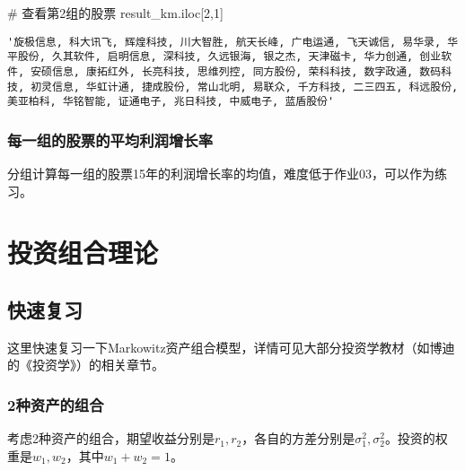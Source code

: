 \documentclass[
  letterpaper,
  DIV=11,
  numbers=noendperiod]{scrreprt}
\newenvironment{Shaded}{\begin{snugshade}}{\end{snugshade}}
\newcommand{\CommentTok}[1]{\textcolor[rgb]{0.37,0.37,0.37}{#1}}
\newcommand{\DecValTok}[1]{\textcolor[rgb]{0.68,0.00,0.00}{#1}}
\newcommand{\NormalTok}[1]{\textcolor[rgb]{0.00,0.23,0.31}{#1}}
\begin{document}
\begin{Shaded}
\begin{Highlighting}[]
\CommentTok{\# 查看第2组的股票}
\NormalTok{result\_km.iloc[}\DecValTok{2}\NormalTok{,}\DecValTok{1}\NormalTok{]}
\end{Highlighting}
\end{Shaded}

\begin{verbatim}
'旋极信息, 科大讯飞, 辉煌科技, 川大智胜, 航天长峰, 广电运通, 飞天诚信, 易华录, 华平股份, 久其软件, 启明信息, 深科技, 久远银海, 银之杰, 天津磁卡, 华力创通, 创业软件, 安硕信息, 康拓红外, 长亮科技, 思维列控, 同方股份, 荣科科技, 数字政通, 数码科技, 初灵信息, 华虹计通, 捷成股份, 常山北明, 易联众, 千方科技, 二三四五, 科远股份, 美亚柏科, 华铭智能, 证通电子, 兆日科技, 中威电子, 蓝盾股份'
\end{verbatim}

\hypertarget{ux6bcfux4e00ux7ec4ux7684ux80a1ux7968ux7684ux5e73ux5747ux5229ux6da6ux589eux957fux7387}{%
\subsection{每一组的股票的平均利润增长率}\label{ux6bcfux4e00ux7ec4ux7684ux80a1ux7968ux7684ux5e73ux5747ux5229ux6da6ux589eux957fux7387}}

分组计算每一组的股票15年的利润增长率的均值，难度低于作业03，可以作为练习。

\hypertarget{ux6295ux8d44ux7ec4ux5408ux7406ux8bba}{%
\chapter{投资组合理论}\label{ux6295ux8d44ux7ec4ux5408ux7406ux8bba}}

\hypertarget{ux5febux901fux590dux4e60}{%
\section{快速复习}\label{ux5febux901fux590dux4e60}}

这里快速复习一下Markowitz资产组合模型，详情可见大部分投资学教材（如博迪的《投资学》）的相关章节。

\hypertarget{ux79cdux8d44ux4ea7ux7684ux7ec4ux5408}{%
\subsection{2种资产的组合}\label{ux79cdux8d44ux4ea7ux7684ux7ec4ux5408}}

考虑2种资产的组合，期望收益分别是\(r_1,r_2\)，各自的方差分别是\(\sigma_1^2, \sigma_2^2\)。投资的权重是\(w_1, w_2\)，其中\(w_1+ w_2 = 1\)。
\end{document}

